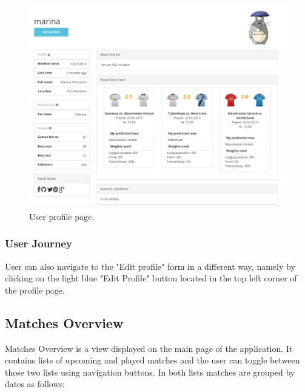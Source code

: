 \begin{figure}[H]
	\begin{center}
		\includegraphics[width=.90\textwidth]{impl/images/profile}
		\caption{User profile page.} 
		\label{fig:profile}
	\end{center}
\end{figure}

\subsubsection*{User Journey}
\label{subsec:authandprofileuserjourney}
User can also navigate to the "Edit profile" form in a different way, namely by clicking on the light blue "Edit Profile" button located in the top left corner of the profile page. 

\subsection{Matches Overview}
Matches Overview is a view displayed on the main page of the application. It contains lists of upcoming and played matches and the user can toggle between those two lists using navigation buttons. In both lists matches are grouped by dates as follows:

